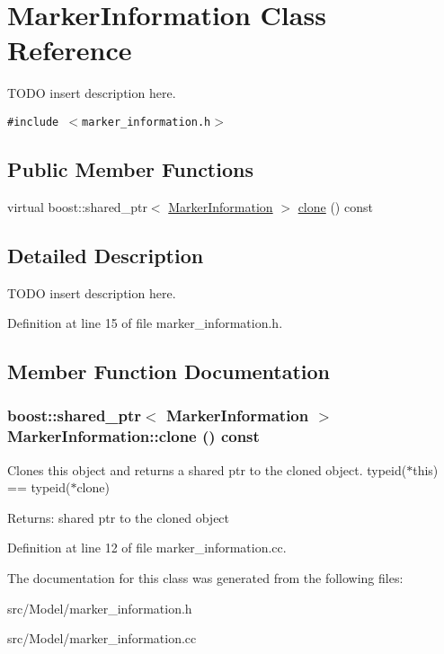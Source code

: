 \hypertarget{class_marker_information}{
\section{MarkerInformation Class Reference}
\label{class_marker_information}
}
TODO insert description here.  


{\tt \#include $<$marker\_\-information.h$>$}

\subsection*{Public Member Functions}
\begin{CompactItemize}
\item 
virtual boost::shared\_\-ptr$<$ \hyperlink{class_marker_information}{MarkerInformation} $>$ \hyperlink{class_marker_information_8ca33ead76cd7206804ee5dc38176b31}{clone} () const 
\end{CompactItemize}


\subsection{Detailed Description}
TODO insert description here. 

Definition at line 15 of file marker\_\-information.h.

\subsection{Member Function Documentation}
\hypertarget{class_marker_information_8ca33ead76cd7206804ee5dc38176b31}{
\subsubsection[clone]{\setlength{\rightskip}{0pt plus 5cm}boost::shared\_\-ptr$<$ {\bf MarkerInformation} $>$ MarkerInformation::clone () const}}
\label{class_marker_information_8ca33ead76cd7206804ee5dc38176b31}


Clones this object and returns a shared ptr to the cloned object. typeid($\ast$this) == typeid($\ast$clone) \begin{Desc}
\item[Returns:]shared ptr to the cloned object \end{Desc}


Definition at line 12 of file marker\_\-information.cc.

The documentation for this class was generated from the following files:\begin{CompactItemize}
\item 
src/Model/marker\_\-information.h\item 
src/Model/marker\_\-information.cc\end{CompactItemize}
